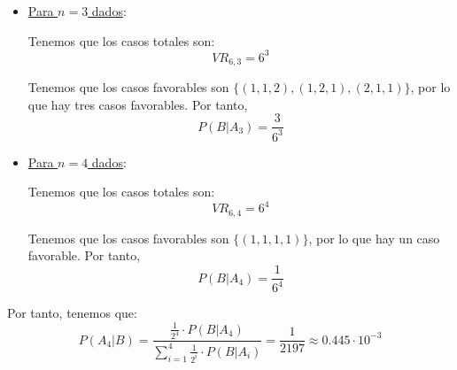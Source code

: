 \begin{ejercicio}
\begin{itemize}
        \item \underline{Para $n=3$ dados}:

        Tenemos que los casos totales son: $$VR_{6,3} = 6^3$$

        Tenemos que los casos favorables son $\{(1,1,2), (1,2,1), (2,1,1)\}$, por lo que hay tres casos favorables. Por tanto,
        \begin{equation*}
            P(B|A_3)=\frac{3}{6^3}
        \end{equation*}

        \item \underline{Para $n=4$ dados}:

        Tenemos que los casos totales son: $$VR_{6,4} = 6^4$$

        Tenemos que los casos favorables son $\{(1,1,1,1)\}$, por lo que hay un caso favorable. Por tanto,
        \begin{equation*}
            P(B|A_4)=\frac{1}{6^4}
        \end{equation*}
    \end{itemize}


    Por tanto, tenemos que:
    \begin{equation*}
        P(A_4|B) = \frac{\frac{1}{2^4}\cdot P(B|A_4)}{\displaystyle \sum_{i=1}^{4}\frac{1}{2^i}\cdot P(B|A_i)}=\frac{1}{2197}\approx 0.445\cdot 10^{-3}
    \end{equation*}
\end{ejercicio}

